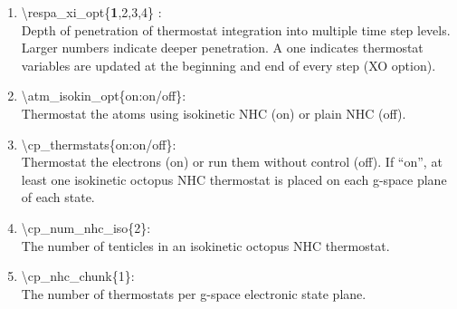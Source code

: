 \documentclass[12pt,titlepage]{article}
\begin{document}
\begin{enumerate}
 \vspace{0.15in}
 \item   \textbackslash respa\_xi\_opt\{{\bf 1},2,3,4\} : \\
   Depth of penetration of thermostat integration into multiple time step
   levels.  Larger numbers indicate deeper penetration.  A one indicates
   thermostat variables are updated at the beginning and end of 
   every step (XO option).

 \vspace{0.15in}
 \item   \textbackslash atm\_isokin\_opt\{on:on/off\}: \\
    Thermostat the atoms using isokinetic NHC (on) or plain NHC (off).

 \vspace{0.15in}
 \item   \textbackslash cp\_thermstats\{on:on/off\}: \\
    Thermostat the electrons (on) or run them without control (off).
    If ``on'', at least one isokinetic octopus NHC thermostat is placed on each
    g-space plane of each state.

 \vspace{0.15in}
 \item   \textbackslash cp\_num\_nhc\_iso\{2\}: \\
    The number of tenticles in an isokinetic octopus NHC thermostat.

 \vspace{0.15in}
 \item   \textbackslash cp\_nhc\_chunk\{1\}: \\
    The number of thermostats per g-space electronic state plane.
\end{enumerate}

\newpage
\end{document}
